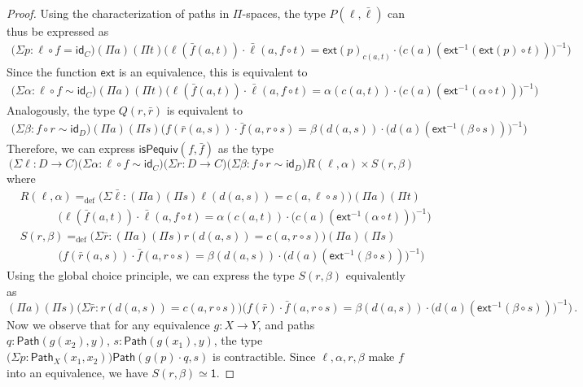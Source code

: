 \documentclass[10pt,a4paper,oneside,reqno]{amsart}
\numberwithin{equation}{section}
\theoremstyle{mythm}
\theoremstyle{mydef}
\theoremstyle{myrmk}
\newcommand{\defeq}{=_{\mathrm{def}}}
\newcommand{\idfun}[1]{\mathsf{id}_{#1}}
\newcommand{\comp}{\circ}
\newcommand{\ct}{\cdot}
\newcommand{\ext}{\mathsf{ext}}
\newcommand{\Id}{\mathsf{Path}}
\newcommand{\one}{\mathsf{1}}
\begin{document}
\begin{proof}
Using the characterization of paths in $\Pi$-spaces, the type $P(\ell,\bar{\ell})$ can thus be expressed as
\begin{align*}
\big(\Sigma p : \ell \comp f = \idfun{C} \big) (\Pi a) (\Pi t) \Big(\ell(\bar{f}(a,t)) \ct \bar{\ell}(a, f \comp t) = \ext(p)_{c(a,t)} \ct \big(c(a)(\ext^{-1}(\ext(p) \circ t))\big)^{-1}\Big)
\end{align*}
Since the function $\ext$ is an equivalence, this is equivalent to
\begin{align*}
\big(\Sigma \alpha : \ell \circ f \sim \idfun{C} \big) (\Pi a) (\Pi t) \Big(\ell(\bar{f}(a,t)) \ct \bar{\ell}(a, f \comp t) = \alpha(c(a,t)) \ct \big(c(a)(\ext^{-1}(\alpha \circ t))\big)^{-1}\Big)
\end{align*}
Analogously, the type $Q(r,\bar{r})$ is equivalent to
\begin{align*}
\big(\Sigma \beta : f \comp r \sim \idfun{D} \big) (\Pi a) (\Pi s) \Big(f(\bar{r}(a,s)) \ct \bar{f}(a, r \comp s) = \beta(d(a,s)) \ct \big(d(a)(\ext^{-1}(\beta \circ s))\big)^{-1}\Big)
\end{align*}
Therefore, we can express $\mathsf{isPequiv}(f,\bar{f})$ as the type
\[ \big(\Sigma \ell : D\to C) \big(\Sigma \alpha : \ell \circ f \sim \idfun{C}\big) \big(\Sigma r : D\to C) \big(\Sigma \beta : f \circ r \sim \idfun{D}\big) R(\ell,\alpha) \times S(r,\beta)\]
where
\begin{align*}
& R(\ell,\alpha) \defeq \big(\Sigma \bar{\ell} : (\Pi a) (\Pi s) \ell(d(a,s))=c(a,\ell \circ s)\big) (\Pi a) (\Pi t) \\ & \;\;\;\;\;\;\;\;\;\;\;\; \Big(\ell(\bar{f}(a,t)) \ct \bar{\ell}(a, f \comp t) = \alpha(c(a,t)) \ct \big(c(a)(\ext^{-1}(\alpha \circ t))\big)^{-1}\Big) \\
& S(r,\beta) \defeq \big(\Sigma \bar{r} : (\Pi a) (\Pi s) r(d(a,s))=c(a,r \circ s) \big) (\Pi a) (\Pi s) \\ & \;\;\;\;\;\;\;\;\;\;\;\; \Big(f(\bar{r}(a,s)) \ct \bar{f}(a, r \comp s) = \beta(d(a,s)) \ct \big(d(a)(\ext^{-1}(\beta \circ s))\big)^{-1}\Big)
\end{align*}
Using the global choice principle, we can express the type $S(r,\beta)$ equivalently as
\[  (\Pi a) (\Pi s) \big(\Sigma \bar{r} : r(d(a,s))=c(a,r \circ s) \big) \Big(f(\bar{r}) \ct \bar{f}(a, r \comp s) = \beta(d(a,s)) \ct \big(d(a)(\ext^{-1}(\beta \circ s))\big)^{-1}\Big) \, .
\]
Now we observe that for any equivalence $g : X \to Y$, and paths $q : \Id(g(x_2),y)$, $s : \Id(g(x_1),y)$, the type $\big(\Sigma p : \Id_X(x_1,x_2)\big) \Id(g(p) \ct q,s)$ is contractible. Since $\ell, \alpha, r, \beta$ make $f$ into an equivalence, we have $S(r,\beta) \simeq \one$.


\end{proof}
\end{document}
